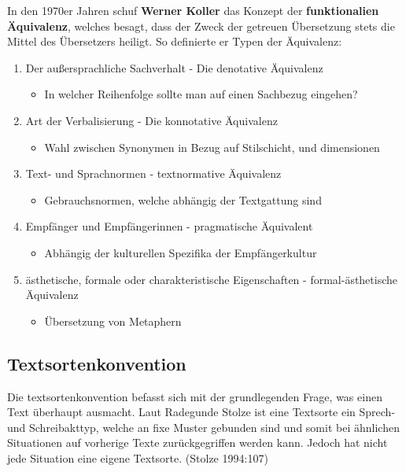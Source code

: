 \documentclass{article}
\begin{document}
	In den 1970er Jahren schuf \textbf{Werner Koller} das Konzept der \textbf{funktionalien Äquivalenz}, welches besagt, dass der Zweck der getreuen Übersetzung stets die Mittel des Übersetzers heiligt. So definierte er Typen der Äquivalenz:
	\begin{enumerate}
		\item{Der außersprachliche Sachverhalt - Die denotative Äquivalenz}
		\begin{itemize}
			\item{In welcher Reihenfolge sollte man auf einen Sachbezug eingehen?}
		\end{itemize}
		\item{Art der Verbalisierung - Die konnotative Äquivalenz}
		\begin{itemize}
			\item{Wahl zwischen Synonymen in Bezug auf Stilschicht, und dimensionen}
		\end{itemize}
		\item{Text- und Sprachnormen - textnormative Äquivalenz}
		\begin{itemize}
			\item{Gebrauchsnormen, welche abhängig der Textgattung sind}
		\end{itemize}
		\item{Empfänger und Empfängerinnen - pragmatische Äquivalent}
		\begin{itemize}
			\item{Abhängig der kulturellen Spezifika der Empfängerkultur}
		\end{itemize}
		\item{ästhetische, formale oder charakteristische Eigenschaften - formal-ästhetische Äquivalenz}
		\begin{itemize}
			\item{Übersetzung von Metaphern}
		\end{itemize}
	\end{enumerate}

	\subsection{Textsortenkonvention}
	Die textsortenkonvention befasst sich mit der grundlegenden Frage, was einen Text überhaupt ausmacht. Laut Radegunde Stolze ist eine Textsorte ein Sprech- und Schreibakttyp, welche an fixe Muster gebunden sind und somit bei ähnlichen Situationen auf vorherige Texte zurückgegriffen werden kann. Jedoch hat nicht jede Situation eine eigene Textsorte. (Stolze 1994:107)
\end{document}
